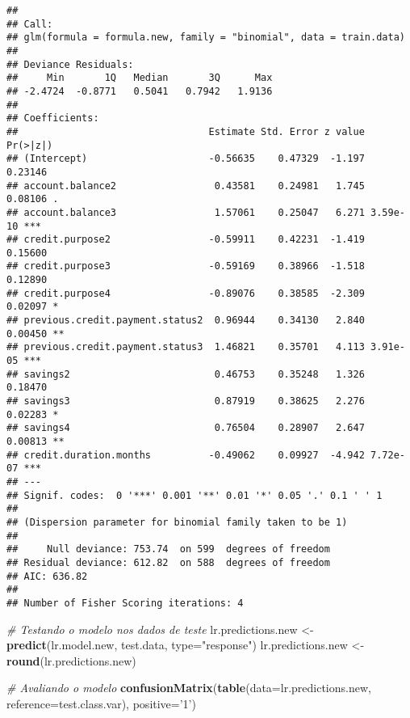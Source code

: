 \documentclass[
]{article}
\newenvironment{Shaded}{\begin{snugshade}}{\end{snugshade}}
\newcommand{\CommentTok}[1]{\textcolor[rgb]{0.56,0.35,0.01}{\textit{#1}}}
\newcommand{\DataTypeTok}[1]{\textcolor[rgb]{0.13,0.29,0.53}{#1}}
\newcommand{\KeywordTok}[1]{\textcolor[rgb]{0.13,0.29,0.53}{\textbf{#1}}}
\newcommand{\NormalTok}[1]{#1}
\newcommand{\StringTok}[1]{\textcolor[rgb]{0.31,0.60,0.02}{#1}}
\begin{document}
\begin{verbatim}
## 
## Call:
## glm(formula = formula.new, family = "binomial", data = train.data)
## 
## Deviance Residuals: 
##     Min       1Q   Median       3Q      Max  
## -2.4724  -0.8771   0.5041   0.7942   1.9136  
## 
## Coefficients:
##                                 Estimate Std. Error z value Pr(>|z|)    
## (Intercept)                     -0.56635    0.47329  -1.197  0.23146    
## account.balance2                 0.43581    0.24981   1.745  0.08106 .  
## account.balance3                 1.57061    0.25047   6.271 3.59e-10 ***
## credit.purpose2                 -0.59911    0.42231  -1.419  0.15600    
## credit.purpose3                 -0.59169    0.38966  -1.518  0.12890    
## credit.purpose4                 -0.89076    0.38585  -2.309  0.02097 *  
## previous.credit.payment.status2  0.96944    0.34130   2.840  0.00450 ** 
## previous.credit.payment.status3  1.46821    0.35701   4.113 3.91e-05 ***
## savings2                         0.46753    0.35248   1.326  0.18470    
## savings3                         0.87919    0.38625   2.276  0.02283 *  
## savings4                         0.76504    0.28907   2.647  0.00813 ** 
## credit.duration.months          -0.49062    0.09927  -4.942 7.72e-07 ***
## ---
## Signif. codes:  0 '***' 0.001 '**' 0.01 '*' 0.05 '.' 0.1 ' ' 1
## 
## (Dispersion parameter for binomial family taken to be 1)
## 
##     Null deviance: 753.74  on 599  degrees of freedom
## Residual deviance: 612.82  on 588  degrees of freedom
## AIC: 636.82
## 
## Number of Fisher Scoring iterations: 4
\end{verbatim}

\begin{Shaded}
\begin{Highlighting}[]
\CommentTok{# Testando o modelo nos dados de teste}
\NormalTok{lr.predictions.new <-}\StringTok{ }\KeywordTok{predict}\NormalTok{(lr.model.new, test.data, }\DataTypeTok{type=}\StringTok{"response"}\NormalTok{) }
\NormalTok{lr.predictions.new <-}\StringTok{ }\KeywordTok{round}\NormalTok{(lr.predictions.new)}

\CommentTok{# Avaliando o modelo}
\KeywordTok{confusionMatrix}\NormalTok{(}\KeywordTok{table}\NormalTok{(}\DataTypeTok{data=}\NormalTok{lr.predictions.new, }\DataTypeTok{reference=}\NormalTok{test.class.var), }\DataTypeTok{positive=}\StringTok{'1'}\NormalTok{)}
\end{Highlighting}
\end{Shaded}
\end{document}
